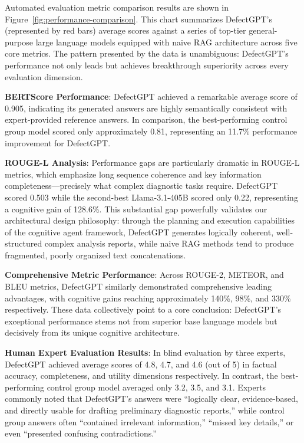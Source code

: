 Automated evaluation metric comparison results are shown in Figure~\ref{fig:performance-comparison}. This chart summarizes DefectGPT's (represented by red bars) average scores against a series of top-tier general-purpose large language models equipped with naive RAG architecture across five core metrics. The pattern presented by the data is unambiguous: DefectGPT's performance not only leads but achieves breakthrough superiority across every evaluation dimension.

\textbf{BERTScore Performance}: DefectGPT achieved a remarkable average score of 0.905, indicating its generated answers are highly semantically consistent with expert-provided reference answers. In comparison, the best-performing control group model scored only approximately 0.81, representing an 11.7\% performance improvement for DefectGPT.

\textbf{ROUGE-L Analysis}: Performance gaps are particularly dramatic in ROUGE-L metrics, which emphasize long sequence coherence and key information completeness—precisely what complex diagnostic tasks require. DefectGPT scored 0.503 while the second-best Llama-3.1-405B scored only 0.22, representing a cognitive gain of 128.6\%. This substantial gap powerfully validates our architectural design philosophy: through the planning and execution capabilities of the cognitive agent framework, DefectGPT generates logically coherent, well-structured complex analysis reports, while naive RAG methods tend to produce fragmented, poorly organized text concatenations.

\textbf{Comprehensive Metric Performance}: Across ROUGE-2, METEOR, and BLEU metrics, DefectGPT similarly demonstrated comprehensive leading advantages, with cognitive gains reaching approximately 140\%, 98\%, and 330\% respectively. These data collectively point to a core conclusion: DefectGPT's exceptional performance stems not from superior base language models but decisively from its unique cognitive architecture.

\textbf{Human Expert Evaluation Results}: In blind evaluation by three experts, DefectGPT achieved average scores of 4.8, 4.7, and 4.6 (out of 5) in factual accuracy, completeness, and utility dimensions respectively. In contrast, the best-performing control group model averaged only 3.2, 3.5, and 3.1. Experts commonly noted that DefectGPT's answers were ``logically clear, evidence-based, and directly usable for drafting preliminary diagnostic reports,'' while control group answers often ``contained irrelevant information,'' ``missed key details,'' or even ``presented confusing contradictions.''

